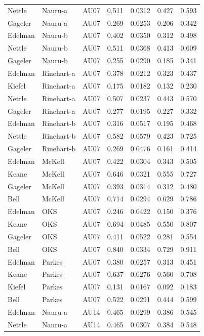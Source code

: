 \documentclass{monashthesis}
\begin{document}
\begin{center}
\begin{longtable}{lllllll}
Nettle & Nauru-a & AU07 & 0.511 & 0.0312 & 0.427 & 0.593 \\
Gageler & Nauru-a & AU07 & 0.269 & 0.0253 & 0.206 & 0.342 \\
Edelman & Nauru-b & AU07 & 0.402 & 0.0350 & 0.312 & 0.498 \\
Nettle & Nauru-b & AU07 & 0.511 & 0.0368 & 0.413 & 0.609 \\
Gageler & Nauru-b & AU07 & 0.255 & 0.0290 & 0.185 & 0.341 \\
Edelman & Rinehart-a & AU07 & 0.378 & 0.0212 & 0.323 & 0.437 \\
Kiefel & Rinehart-a & AU07 & 0.175 & 0.0182 & 0.132 & 0.230 \\
Nettle & Rinehart-a & AU07 & 0.507 & 0.0237 & 0.443 & 0.570 \\
Gageler & Rinehart-a & AU07 & 0.277 & 0.0195 & 0.227 & 0.332 \\
Edelman & Rinehart-b & AU07 & 0.316 & 0.0517 & 0.195 & 0.468 \\
Nettle & Rinehart-b & AU07 & 0.582 & 0.0579 & 0.423 & 0.725 \\
Gageler & Rinehart-b & AU07 & 0.269 & 0.0476 & 0.161 & 0.414 \\
Edelman & McKell & AU07 & 0.422 & 0.0304 & 0.343 & 0.505 \\
Keane & McKell & AU07 & 0.646 & 0.0321 & 0.555 & 0.727 \\
Gageler & McKell & AU07 & 0.393 & 0.0314 & 0.312 & 0.480 \\
Bell & McKell & AU07 & 0.714 & 0.0294 & 0.629 & 0.786 \\
Edelman & OKS & AU07 & 0.246 & 0.0422 & 0.150 & 0.376 \\
Keane & OKS & AU07 & 0.694 & 0.0485 & 0.550 & 0.807 \\
Gageler & OKS & AU07 & 0.411 & 0.0522 & 0.281 & 0.554 \\
Bell & OKS & AU07 & 0.840 & 0.0334 & 0.729 & 0.911 \\
Edelman & Parkes & AU07 & 0.380 & 0.0257 & 0.313 & 0.451 \\
Keane & Parkes & AU07 & 0.637 & 0.0276 & 0.560 & 0.708 \\
Kiefel & Parkes & AU07 & 0.131 & 0.0167 & 0.092 & 0.183 \\
Bell & Parkes & AU07 & 0.522 & 0.0291 & 0.444 & 0.599 \\
Edelman & Nauru-a & AU14 & 0.465 & 0.0299 & 0.386 & 0.545 \\
Nettle & Nauru-a & AU14 & 0.465 & 0.0307 & 0.384 & 0.548 \\

\end{longtable}
\end{center}
\end{document}
